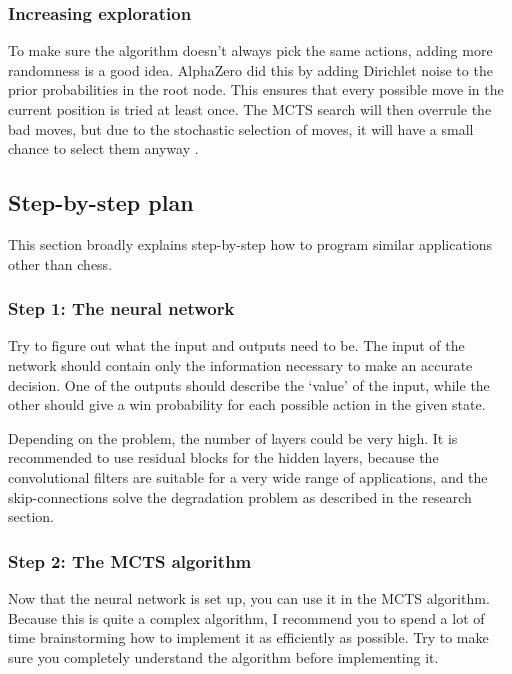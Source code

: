 \documentclass{article}
\begin{document}
\subsubsection{Increasing exploration}

To make sure the algorithm doesn't always pick the same actions, adding more randomness is a good idea. 
AlphaZero did this by adding Dirichlet noise to the prior probabilities in the root node.
This ensures that every possible move in the current position is tried at least once. The MCTS search 
will then overrule the bad moves, but due to the stochastic selection of moves, 
it will have a small chance to select them anyway \cite{monkPurposeDirichletNoise2018,DirichletDistributionWikipedia}.

\subsection{Step-by-step plan}

This section broadly explains step-by-step how to program similar applications other than chess.

\subsubsection{Step 1: The neural network}

Try to figure out what the input and outputs need to be. The input of the network should contain
only the information necessary to make an accurate decision. One of the outputs should describe 
the `value' of the input, while the other should give a win probability for each possible action in the given state.

Depending on the problem, the number of layers could be very high. It is recommended to use residual blocks
for the hidden layers, because the convolutional filters are suitable for a very wide range of applications, 
and the skip-connections solve the degradation problem as described in the research section.

\subsubsection{Step 2: The MCTS algorithm}

Now that the neural network is set up, you can use it in the MCTS algorithm.
Because this is quite a complex algorithm, I recommend you to spend a lot of time brainstorming 
how to implement it as efficiently as possible. Try to make sure you completely understand the algorithm
before implementing it.
\end{document}
